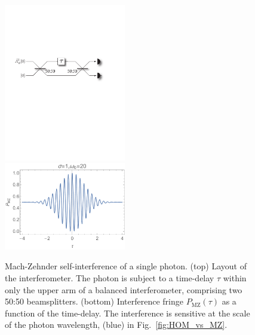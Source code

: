\begin{figure}[!htbp]
	\includegraphics[clip=true, width=0.475\textwidth]{MZ_setup} \\
	\includegraphics[clip=true, width=0.475\textwidth]{MZ}
	\captionspacefig \caption{Mach-Zehnder self-interference of a single photon. (top) Layout of the interferometer. The photon is subject to a time-delay $\tau$ within only the upper arm of a balanced interferometer, comprising two 50:50 beamsplitters. (bottom) Interference fringe $P_\mathrm{MZ}(\tau)$ as a function of the time-delay. The interference is sensitive at the scale of the photon wavelength, (blue) in Fig.~\ref{fig:HOM_vs_MZ}.} \label{fig:MZ_inter}
\end{figure}

